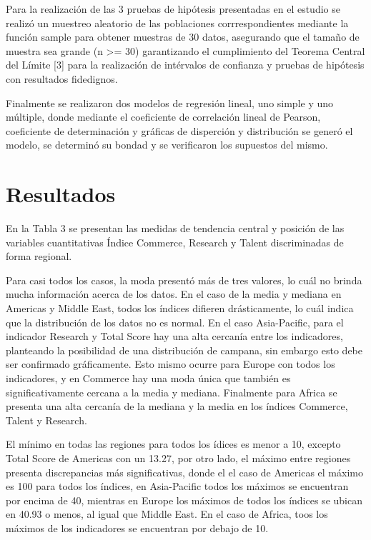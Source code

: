 \documentclass[
]{article}
\begin{document}
\begin{multicols}{2}
Para la realización de las 3 pruebas de hipótesis presentadas en el estudio se realizó un muestreo aleatorio de las poblaciones corrrespondientes mediante la función sample para obtener muestras de 30 datos, asegurando que el tamaño de muestra sea grande (n >= 30) garantizando el cumplimiento del Teorema Central del Límite [3] para la realización de intérvalos de confianza y pruebas de hipótesis con resultados fidedignos.

Finalmente se realizaron dos modelos de regresión lineal, uno simple y uno múltiple, donde mediante el coeficiente de correlación lineal de Pearson, coeficiente de determinación y gráficas de disperción y distribución se generó el modelo, se determinó su bondad y se verificaron los supuestos del mismo.







\section{Resultados}
En la Tabla 3 se presentan las medidas de tendencia central y posición de las variables cuantitativas Índice Commerce, Research y Talent discriminadas de forma regional. 

Para casi todos los casos, la moda presentó más de tres valores, lo cuál no brinda mucha información acerca de los datos. En el caso de la media y mediana en Americas y Middle East, todos los índices difieren drásticamente, lo cuál indica que la distribución de los datos no es normal. En el caso Asia-Pacific, para el indicador Research y Total Score hay una alta cercanía entre los indicadores, planteando la posibilidad de una distribución de campana, sin embargo esto debe ser confirmado gráficamente. Esto mismo ocurre para Europe con todos los indicadores, y en Commerce hay una moda única que también es significativamente cercana a la media y mediana. Finalmente para Africa se presenta una alta cercanía de la mediana y la media en los índices Commerce, Talent y Research.

El mínimo en todas las regiones para todos los ídices es menor a 10, excepto Total Score de Americas con un 13.27, por otro lado, el máximo entre regiones presenta discrepancias más significativas, donde el el caso de Americas el máximo es 100 para todos los índices, en Asia-Pacific todos los máximos se encuentran por encima de 40, mientras en Europe los máximos de todos los índices se ubican en 40.93 o menos, al igual que Middle East. En el caso de Africa, toos los máximos de los indicadores se encuentran por debajo de 10.

\end{multicols}
\end{document}
